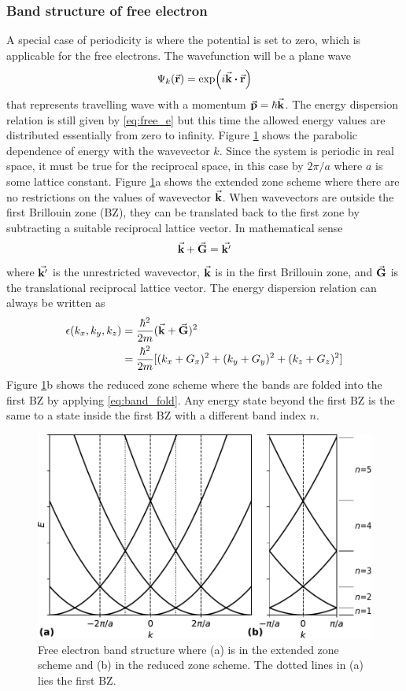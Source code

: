 \subsubsection{Band structure of free electron}
A special case of periodicity is where the potential is set to zero, which is applicable for the free electrons. The wavefunction will be a plane wave
\begin{equation}
	\Psi_k(\va{r})  = \exp(i \va{k} \vdot \va{r})
\end{equation}
that represents travelling wave with a momentum $\va{p} = \hbar \va{k}$. The energy dispersion relation is still given by \eqref{eq:free_e} but this time the allowed energy values are distributed essentially from zero to infinity. Figure \ref{fig:free-electron} shows the parabolic dependence of energy with the wavevector $k$. Since the system is periodic in real space, it must be true for the reciprocal space, in this case by $2\pi/a$ where $a$ is some lattice constant. Figure \ref{fig:free-electron}a shows the extended zone scheme where there are no restrictions on the values of wavevector $\va{k}$. When wavevectors are outside the first Brillouin zone (BZ), they can be translated back to the first zone by subtracting a suitable reciprocal lattice vector. In mathematical sense \citep{Kittel2004}
\begin{equation} \label{eq:band_fold}
	\va{k} + \va{G} = \va{k'}
\end{equation}
where $\va{k'}$ is the unrestricted wavevector, $\va{k}$ is in the first Brillouin zone, and $\va{G}$ is the translational reciprocal lattice vector. The energy dispersion relation can always be written as
\begin{align}
	\epsilon(k_x,k_y,k_z) & = \frac{\hbar^2}{2m} (\va{k}+\va{G})^2 \notag                       \\
	                      & = \frac{\hbar^2}{2m}[(k_x + G_x)^2 + (k_y + G_y)^2 + (k_z + G_z)^2]
\end{align}
Figure \ref{fig:free-electron}b shows the reduced zone scheme where the  bands are folded into the first BZ by applying \eqref{eq:band_fold}. Any energy state beyond the first BZ is the same to a state inside the first BZ with a different band index $n$.

\begin{figure}[tbh!]
	\centering
	\includegraphics[width=0.6\linewidth]{"images/theory/bands_free"}
	\caption[Free electron band structure]{Free electron band structure where (a) is in the extended zone scheme and (b) in the reduced zone scheme. The dotted lines in (a) lies the first BZ.}
	\label{fig:free-electron}
\end{figure}

